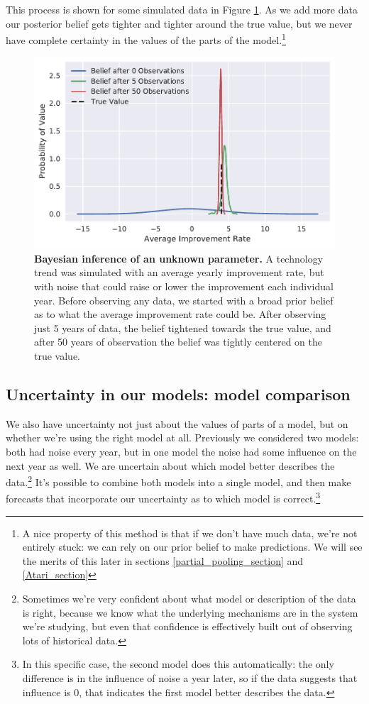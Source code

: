 \documentclass{article}
\begin{document}
This process is shown for some simulated data in Figure \ref{fig:bayesian_updating}. As we add more data our posterior belief gets tighter and tighter around the true value, but we never have complete certainty in the values of the parts of the model.\footnote{A nice property of this method is that if we don't have much data, we're not entirely stuck: we can rely on our prior belief to make predictions. We will see the merits of this later in sections \ref{partial_pooling_section} and \ref{Atari_section}}

\begin{figure}
    \centering
    \includegraphics[width=.75\textwidth]{figs/bayesian_updating.pdf}
    \caption{\textbf{Bayesian inference of an unknown parameter.} A technology trend was simulated with an average yearly improvement rate, but with noise that could raise or lower the improvement each individual year. Before observing any data, we started with a broad prior belief as to what the average improvement rate could be. After observing just 5 years of data, the belief tightened towards the true value, and after 50 years of observation the belief was tightly centered on the true value.}
    \label{fig:bayesian_updating}
\end{figure}

\subsection{Uncertainty in our models: model comparison}
We also have uncertainty not just about the values of parts of a model, but on whether we're using the right model at all. Previously we considered two models: both had noise every year, but in one model the noise had some influence on the next year as well. We are uncertain about which model better describes the data.\footnote{Sometimes we're very confident about what model or description of the data is right, because we know what the underlying mechanisms are in the system we're studying, but even that confidence is effectively built out of observing lots of historical data.} It's possible to combine both models into a single model, and then make forecasts that incorporate our uncertainty as to which model is correct.\footnote{In this specific case, the second model does this automatically: the only difference is in the influence of noise a year later, so if the data suggests that influence is 0, that indicates the first model better describes the data.} 
\end{document}

